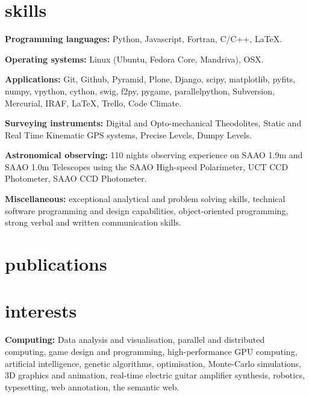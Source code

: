 \documentclass[]{friggeri-cv} %
\begin{document}

\section{skills}

\textbf{Programming languages:} Python, Javascript, Fortran, C/C++, \LaTeX.

\textbf{Operating systems:} Linux (Ubuntu, Fedora Core, Mandriva), OSX.

\textbf{Applications:} Git, Github, Pyramid, Plone, Django, scipy, matplotlib, pyfits, numpy, vpython, cython, swig, f2py, pygame, parallelpython, Subversion, Mercurial, IRAF, \LaTeX, Trello, Code Climate.

\textbf{Surveying instruments:} Digital and Opto-mechanical Theodolites, Static and Real Time Kinematic GPS
    systems, Precise Levels, Dumpy Levels.
    
\textbf{Astronomical observing:} 110 nights observing experience on SAAO 1.9m and SAAO 1.0m Telescopes using
     the SAAO High-speed Polarimeter, UCT CCD Photometer, SAAO CCD Photometer.

\textbf{Miscellaneous:} exceptional analytical and problem solving skills, technical software programming and design capabilities, object-oriented programming, strong verbal and written communication skills.


\section{publications}


\section{interests}

\textbf{Computing:} Data analysis and visualisation, parallel and distributed computing, game design and programming, high-performance GPU computing, artificial intelligence, genetic algorithms, optimisation, Monte-Carlo simulations, 3D graphics and animation, real-time electric guitar amplifier synthesis, robotics, typesetting, web annotation, the semantic web.
\end{document}
